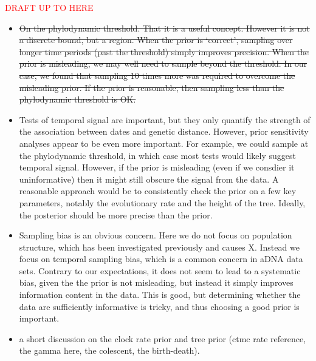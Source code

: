 \documentclass[11pt]{article}
\begin{document}
\textcolor{red}{DRAFT UP TO HERE}
\begin{itemize}
    \item \sout{On the phylodynamic threshold. That it is a useful concept. However it is not a discrete bound, but a region. When the prior is `correct', sampling over longer time periods (past the threshold) simply improves precision. When the prior is misleading, we may well need to sample beyond the threshold. In our case, we found that sampling 10 times more was required to overcome the misleading prior. If the prior is reasonable, then sampling less than the phylodynamic threshold is OK.}
    \item Tests of temporal signal are important, but they only quantify the strength of the association between dates and genetic distance. However, prior sensitivity analyses appear to be even more important. For example, we could sample at the phylodynamic threshold, in which case most tests would likely suggest temporal signal. However, if the prior is misleading (even if we consdier it uninformative) then it might still obscure the signal from the data. A reasonable approach would be to consistently check the prior on a few key parameters, notably the evolutionary rate and the height of the tree. Ideally, the posterior should be more precise than the prior.
    \item Sampling bias is an obvious concern. Here we do not focus on population structure, which has been investigated previously and causes X. Instead we focus on temporal sampling bias, which is a common concern in aDNA data sets. Contrary to our expectations, it does not seem to lead to a systematic bias, given the the prior is not misleading, but instead it simply improves information content in the data. This is good, but determining whether the data are sufficiently informative is tricky, and thus choosing a good prior is important. 
    \item a short discussion on the clock rate prior and tree prior (ctmc rate reference, the gamma here, the colescent, the birth-death).
    
\end{itemize}
\end{document}

